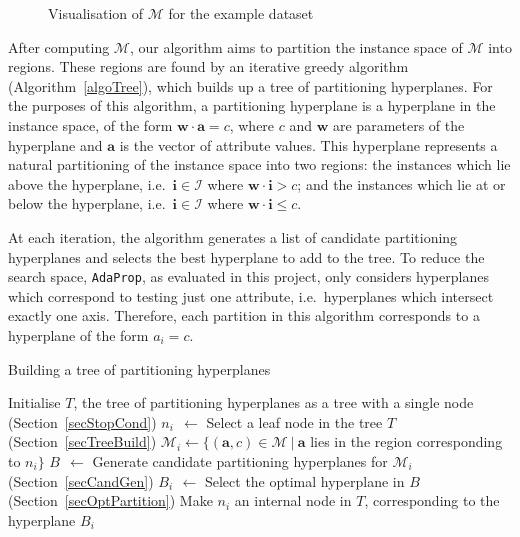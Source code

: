 \documentclass[a4paper,12pt]{report} %
\newcommand{\AdaProp}{\texttt{AdaProp}\xspace}
\newcommand{\mcl}[1]{\mathcal{#1}}
\newcommand{\vect}[1]{\boldsymbol{#1}}
\begin{document}
\begin{figure}
\begin{center}
\end{center}
\caption{Visualisation of $\mcl{M}$ for the example dataset}
\label{visM}
\end{figure}

After computing $\mcl{M}$, 
    our algorithm
    aims to partition the instance space of $\mcl{M}$ into regions.
These regions are found by an iterative greedy algorithm (Algorithm~\ref{algoTree}), 
    which builds up a tree of partitioning hyperplanes.
For the purposes of this algorithm, 
    a partitioning hyperplane is a hyperplane in the instance space, 
    of the form $\vect{w} \cdot \vect{a} = c$,
    where $c$ and $\vect{w}$ are parameters of the hyperplane and 
    $\vect{a}$ is the vector of attribute values.
This hyperplane represents a natural partitioning of the instance space
    into two regions:
        the instances which lie above the hyperplane, 
            i.e.\ $\vect{i} \in \mcl{I}$ where $\vect{w} \cdot \vect{i} > c$; and
        the instances which lie at or below the hyperplane,
            i.e.\ $\vect{i} \in \mcl{I}$ where $\vect{w} \cdot \vect{i} \leq c$.
    
At each iteration,
    the algorithm generates a list of candidate partitioning hyperplanes and
    selects the best hyperplane to add to the tree.
To reduce the search space,
    \AdaProp, as evaluated in this project,
     only considers hyperplanes which
    correspond to testing just one attribute, 
    i.e.\ hyperplanes which intersect exactly one axis.
Therefore, each partition in this algorithm
    corresponds to a hyperplane of the form $a_i = c$.

\begin{algorithm}
\caption{Building a tree of partitioning hyperplanes}
\label{algoTree} 
\begin{algorithmic}
\State Initialise $T$, the tree of partitioning hyperplanes as a tree with a single node
 \hfill (Section~\ref{secStopCond})
    \State $n_i ~~\gets$ Select a leaf node in the tree $T$ \hfill (Section~\ref{secTreeBuild})
    \State $\mcl{M}_i \gets \{ (\vect{a},c) \in \mcl{M} ~|~ \vect{a}$ 
        lies in the region corresponding to $n_i \}$
    \State $B ~~\gets$ Generate candidate partitioning hyperplanes for 
        $\mcl{M}_i$ \hfill (Section~\ref{secCandGen})
    \State $B_i \,~\gets$ Select the optimal hyperplane in $B$ \hfill (Section~\ref{secOptPartition})
    \State Make $n_i$ an internal node in $T$, corresponding 
        to the hyperplane $B_i$
\EndWhile
\end{algorithmic}
\end{algorithm}
\end{document}
